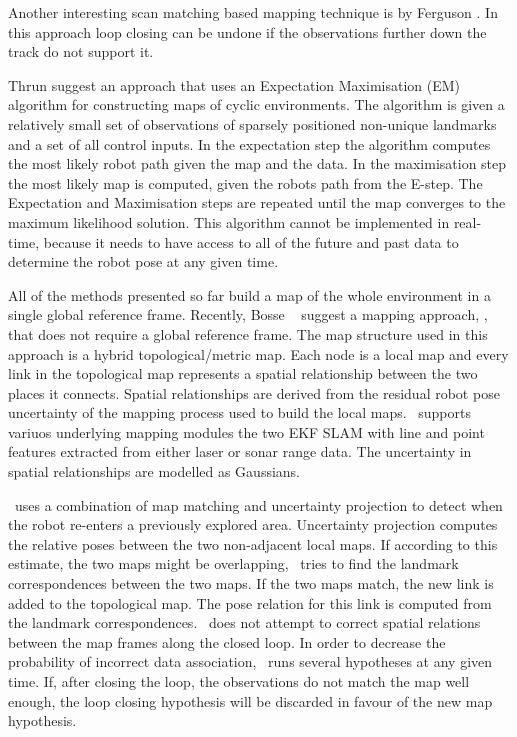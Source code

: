 Another interesting scan matching based mapping technique is
\cite{fergusson2003} by Ferguson \etal. In this approach loop closing
can be undone if the observations further down the track do not
support it.

Thrun \etal \cite{slam_thrun98b,Thrun98a,thrun98:_probab} suggest an
approach that uses an Expectation Maximisation (EM) algorithm for
constructing maps of cyclic environments. The algorithm is given a
relatively small set of observations of sparsely positioned non-unique
landmarks and a set of all control inputs. In the expectation step the
algorithm computes the most likely robot path given the map and the
data. In the maximisation step the most likely map is computed, given
the robots path from the E-step. The Expectation and Maximisation
steps are repeated until the map converges to the maximum likelihood
solution. This algorithm cannot be implemented in real-time, because
it needs to have access to all of the future and past data to
determine the robot pose at any given time.

All of the methods presented so far build a map of the whole
environment in a single global reference frame. Recently, Bosse \etal\
\cite{bosse03atlas} suggest a mapping approach, \Atlas, that does not
require a global reference frame. The map structure used in this
approach is a hybrid topological/metric map.  Each node is a local map
and every link in the topological map represents a spatial
relationship between the two places it connects.  Spatial
relationships are derived from the residual robot pose uncertainty of
the mapping process used to build the local maps. \Atlas\ supports variuos 
underlying mapping modules the two EKF SLAM with line and point features extracted from
either laser or sonar range data. The uncertainty in spatial
relationships are modelled as Gaussians.

\Atlas\ uses a combination of map matching and uncertainty projection
to detect when the robot re-enters a previously explored
area. Uncertainty projection computes the relative poses between the
two non-adjacent local maps. If according to this estimate, the two
maps might be overlapping, \Atlas\ tries to find the landmark
correspondences between the two maps. If the two maps match, the new
link is added to the topological map. The pose relation for this link
is computed from the landmark correspondences. \Atlas\ does not
attempt to correct spatial relations between the map frames along the
closed loop. In order to decrease the probability of incorrect data
association, \Atlas\ runs several hypotheses at any given time. If,
after closing the loop, the observations do not match the map well
enough, the loop closing hypothesis will be discarded in favour of the
new map hypothesis.

